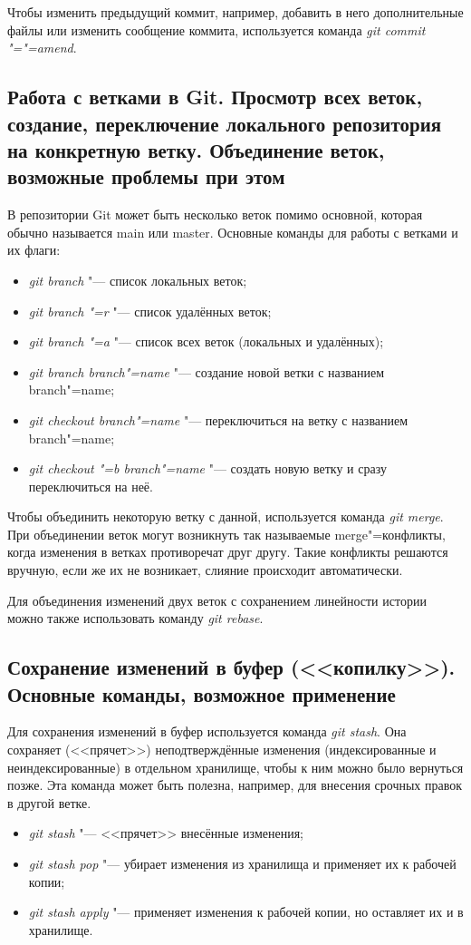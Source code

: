 \documentclass[12pt]{article}
\begin{document}
Чтобы изменить предыдущий коммит, например, добавить в него дополнительные файлы или изменить сообщение коммита, используется команда \textit{git commit "="=amend}.

\subsection{Работа с ветками в Git. Просмотр всех веток, создание, переключение локального репозитория на конкретную ветку. Объединение веток, возможные проблемы при этом}
В репозитории Git может быть несколько веток помимо основной, которая обычно называется main или master. Основные команды для работы с ветками и их флаги:
\begin{itemize}
\item \textit{git branch} "--- список локальных веток;
\item \textit{git branch "=r} "--- список удалённых веток;
\item \textit{git branch "=a} "--- список всех веток (локальных и удалённых);
\item \textit{git branch branch"=name} "--- создание новой ветки с названием branch"=name;
\item \textit{git checkout branch"=name} "--- переключиться на ветку с названием branch"=name;
\item \textit{git checkout "=b branch"=name} "--- создать новую ветку и сразу переключиться на неё.
\end{itemize}

Чтобы объединить некоторую ветку с данной, используется команда \textit{git merge}. При объединении веток могут возникнуть так называемые merge"=конфликты, когда изменения в ветках противоречат друг другу. Такие конфликты решаются вручную, если же их не возникает, слияние происходит автоматически.

Для объединения изменений двух веток с сохранением линейности истории можно также использовать команду \textit{git rebase}.

\subsection{Сохранение изменений в буфер (<<копилку>>). Основные команды, возможное применение}
Для сохранения изменений в буфер используется команда \textit{git stash}. Она сохраняет (<<прячет>>) неподтверждённые изменения (индексированные и неиндексированные) в отдельном хранилище, чтобы к ним можно было вернуться позже. Эта команда может быть полезна, например, для внесения срочных правок в другой ветке.
\begin{itemize}
\item \textit{git stash} "--- <<прячет>> внесённые изменения;
\item \textit{git stash pop} "--- убирает изменения из хранилища и применяет их к рабочей копии;
\item \textit{git stash apply} "--- применяет изменения к рабочей копии, но оставляет их и в хранилище.
\end{itemize}
\end{document}
